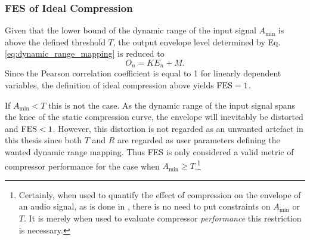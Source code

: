 \documentclass[../main2.tex]{subfiles}
\begin{document}
\subsubsection{FES of Ideal Compression}
Given that the lower bound of the dynamic range of the input signal $A_\text{min}$ is above the defined threshold $T$, the output envelope level determined by Eq.\eqref{eq:dynamic_range_mapping} is reduced to
\begin{equation}
O_n = K E_n + M.
\end{equation}
Since the Pearson correlation coefficient is equal to 1 for linearly dependent variables, the definition of ideal compression above yields $\text{FES}= 1$.

If $A_\text{min} < T$ this is not the case. As the dynamic range of the input signal spans the knee of the static compression curve, the envelope will inevitably be distorted and $\text{FES}< 1$. However, this distortion is not regarded as an unwanted artefact in this thesis since both $T$ and $R$ are regarded as user parameters defining the wanted dynamic range mapping. Thus FES is only considered a valid metric of compressor performance for the case when $A_\text{min} \geq T$.\footnote{Certainly, when used to quantify the effect of compression on the envelope of an audio signal, as is done in \cite{stone2007quantifying}, there is no need to put constraints on $A_\text{min}$ or $T$. It is merely when used to evaluate compressor \emph{performance} this restriction is necessary.}

\end{document}
